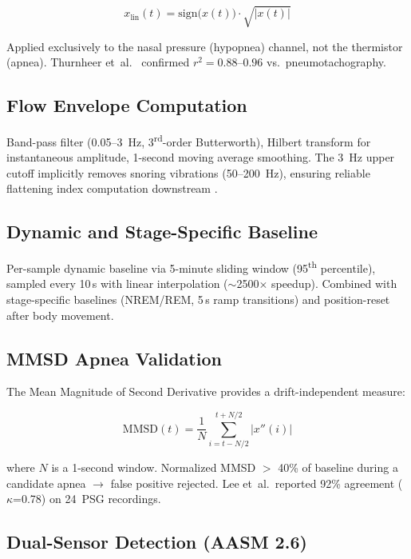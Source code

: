 \documentclass[11pt,a4paper,twocolumn]{article}
\begin{document}
\begin{equation}
x_{\mathrm{lin}}(t) = \mathrm{sign}\big(x(t)\big) \cdot \sqrt{|x(t)|}
\label{eq:sqrt}
\end{equation}

Applied exclusively to the nasal pressure (hypopnea) channel, not the thermistor (apnea). Thurnheer et~al.\ \cite{thurnheer2001} confirmed $r^2=0.88$--$0.96$ vs.\ pneumotachography.

\subsection{Flow Envelope Computation}

Band-pass filter (0.05--3~Hz, 3\textsuperscript{rd}-order Butterworth), Hilbert transform for instantaneous amplitude, 1-second moving average smoothing. The 3~Hz upper cutoff implicitly removes snoring vibrations (50--200~Hz), ensuring reliable flattening index computation downstream \cite{hosselet1998}.

\subsection{Dynamic and Stage-Specific Baseline}

Per-sample dynamic baseline via 5-minute sliding window (95\textsuperscript{th} percentile), sampled every 10\,s with linear interpolation ($\sim$2500$\times$ speedup). Combined with stage-specific baselines (NREM/REM, 5\,s ramp transitions) and position-reset after body movement.

\subsection{MMSD Apnea Validation}

The Mean Magnitude of Second Derivative \cite{lee2008} provides a drift-independent measure:

\begin{equation}
\mathrm{MMSD}(t) = \frac{1}{N}\sum_{i=t-N/2}^{t+N/2} |x''(i)|
\label{eq:mmsd}
\end{equation}

where $N$ is a 1-second window. Normalized MMSD $>$ 40\% of baseline during a candidate apnea $\to$ false positive rejected. Lee et~al.\ reported 92\% agreement ($\kappa$=0.78) on 24~PSG recordings.

\subsection{Dual-Sensor Detection (AASM 2.6)}
\end{document}
